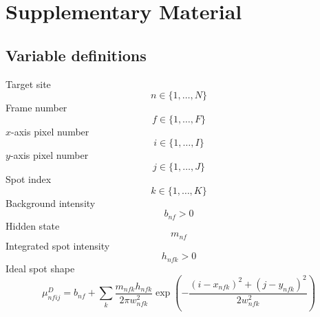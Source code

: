 \section{Supplementary Material}

\subsection{Variable definitions}

Target site
\begin{equation*}
    n \in \{1,\dots,N\}
\end{equation*}
%
Frame number
\begin{equation*}
    f \in \{1,\dots,F\}
\end{equation*}
%
$x$-axis pixel number
\begin{equation*}
    i \in \{1,\dots,I\}
\end{equation*}
%
$y$-axis pixel number
\begin{equation*}
    j \in \{1,\dots,J\}
\end{equation*}
%
Spot index
\begin{equation*}
    k \in \{1,\dots,K\}
\end{equation*}
%
Background intensity
\begin{equation*}
    b_{nf} > 0
\end{equation*}
%
Hidden state
\begin{equation*}
    m_{nf}
\end{equation*}
%
Integrated spot intensity
\begin{equation*}
    h_{nfk} > 0
\end{equation*}
%
Ideal spot shape
\begin{equation*}
    \mu^{D}_{nfij} = b_{nf} + \sum_k \dfrac{m_{nfk}h_{nfk}}{2 \pi w^2_{nfk}} \exp{\left ( -\dfrac{(i-x_{nfk})^2 + (j-y_{nfk})^2}{2w^2_{nfk}} \right)}
\end{equation*}